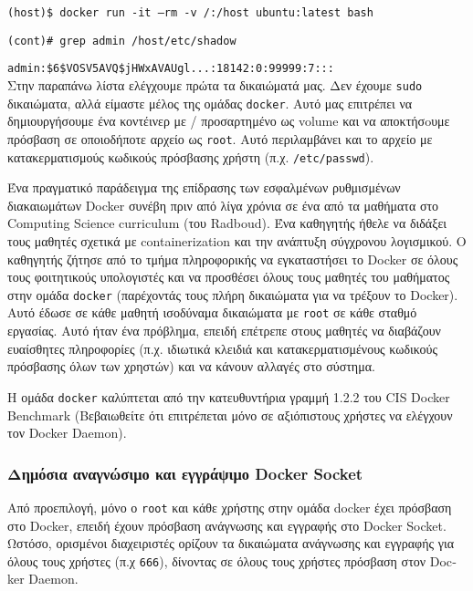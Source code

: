 \texttt{\textlatin{(host)\$ docker run -it --rm -v /:/host ubuntu:latest bash}}

\texttt{\textlatin{(cont)\# grep admin /host/etc/shadow}}

\texttt{\textlatin{admin:\$6\$VOSV5AVQ\$jHWxAVAUgl...:18142:0:99999:7:::}} \\


Στην παραπάνω λίστα ελέγχουμε πρώτα τα δικαιώματά μας. Δεν έχουμε
\texttt{\textlatin{sudo}} δικαιώματα, αλλά είμαστε μέλος της ομάδας
\texttt{\textlatin{docker}}. Αυτό μας επιτρέπει να δημιουργήσουμε ένα κοντέινερ
με / προσαρτημένο ως \textlatin{volume} και να αποκτήσoυμε πρόσβαση σε
οποιοδήποτε αρχείο ως \texttt{\textlatin{root}}.
Αυτό περιλαμβάνει και το αρχείο με κατακερματισμούς κωδικούς πρόσβασης χρήστη
(π.χ. \texttt{\textlatin{/etc/passwd}}).

Ένα πραγματικό παράδειγμα της επίδρασης των εσφαλμένων ρυθμισμένων διακαιωμάτων
\textlatin{Docker} συνέβη πριν από λίγα χρόνια σε ένα από τα μαθήματα στο
\textlatin{Computing Science curriculum} (του \textlatin{Radboud}). Ένα
καθηγητής ήθελε να διδάξει τους μαθητές σχετικά με \textlatin{containerization}
και την ανάπτυξη σύγχρονου λογισμικού. Ο καθηγητής ζήτησε από το τμήμα
πληροφορικής να εγκαταστήσει το \textlatin{Docker} σε όλους τους φοιτητικούς
υπολογιστές και να προσθέσει όλους τους μαθητές του μαθήματος στην ομάδα
\texttt{\textlatin{docker}} (παρέχοντάς τους πλήρη δικαιώματα για να τρέξουν το
\textlatin{Docker}). Αυτό έδωσε σε κάθε μαθητή ισοδύναμα δικαιώματα με
\texttt{\textlatin{root}} σε κάθε σταθμό εργασίας. Αυτό ήταν ένα
πρόβλημα, επειδή επέτρεπε στους μαθητές να διαβάζουν ευαίσθητες πληροφορίες
(π.χ. ιδιωτικά κλειδιά και κατακερματισμένους κωδικούς πρόσβασης όλων των
χρηστών) και να κάνουν αλλαγές στο σύστημα.

Η ομάδα \texttt{\textlatin{docker}} καλύπτεται από την κατευθυντήρια γραμμή
1.2.2 του \textlatin{CIS Docker Benchmark} (Βεβαιωθείτε ότι επιτρέπεται μόνο σε
αξιόπιστους χρήστες να ελέγχουν τον \textlatin{Docker Daemon}).

\subsubsection{Δημόσια αναγνώσιμο και εγγράψιμο \textlatin{Docker Socket}}

Από προεπιλογή, μόνο ο \texttt{\textlatin{root}} και κάθε χρήστης στην ομάδα
\textlatin{docker} έχει πρόσβαση στο \textlatin{Docker}, επειδή έχουν πρόσβαση
ανάγνωσης και εγγραφής στο \textlatin{Docker Socket}. Ωστόσο, ορισμένοι
διαχειριστές ορίζουν τα δικαιώματα ανάγνωσης και εγγραφής για όλους τους χρήστες
(π.χ \texttt{666}), δίνοντας σε όλους τους χρήστες πρόσβαση στον
\textlatin{Docker Daemon}. \\

